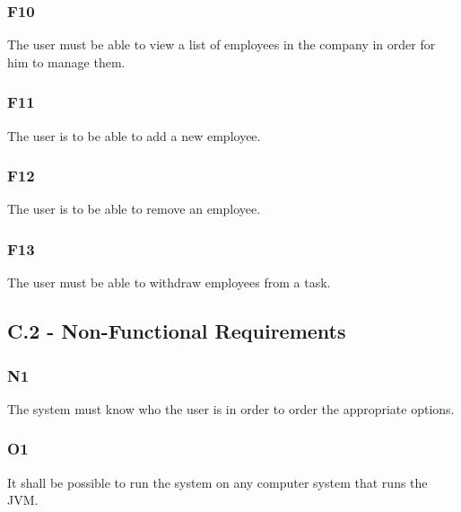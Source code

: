 \documentclass[12pt]{article}
\begin{document}
\subsubsection{F10}
{
The user must be able to view a list of employees in the company in order for him to manage them.
}
\subsubsection{F11}
{
The user is to be able to add a new employee.
}
\subsubsection{F12}
{
The user is to be able to remove an employee.
}
\subsubsection{F13}                                                                         
{
The user must be able to withdraw employees from a task.
}
\subsection{C.2 - Non-Functional Requirements}
\subsubsection{N1}
{
The system must know who the user is in order to order the appropriate options.
}
\subsubsection{O1}
{
It shall be possible to run the system on any computer system that runs the JVM.
}
\end{document}
